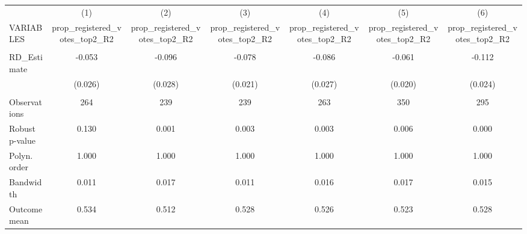 \documentclass[]{article}
\begin{document}
\begin{tabular}{lcccccc} \hline
 & (1) & (2) & (3) & (4) & (5) & (6) \\
VARIABLES & prop\_registered\_votes\_top2\_R2 & prop\_registered\_votes\_top2\_R2 & prop\_registered\_votes\_top2\_R2 & prop\_registered\_votes\_top2\_R2 & prop\_registered\_votes\_top2\_R2 & prop\_registered\_votes\_top2\_R2 \\ \hline
 &  &  &  &  &  &  \\
RD\_Estimate & -0.053 & -0.096 & -0.078 & -0.086 & -0.061 & -0.112 \\
 & (0.026) & (0.028) & (0.021) & (0.027) & (0.020) & (0.024) \\
 &  &  &  &  &  &  \\
Observations & 264 & 239 & 239 & 263 & 350 & 295 \\
Robust p-value & 0.130 & 0.001 & 0.003 & 0.003 & 0.006 & 0.000 \\
Polyn. order & 1.000 & 1.000 & 1.000 & 1.000 & 1.000 & 1.000 \\
Bandwidth & 0.011 & 0.017 & 0.011 & 0.016 & 0.017 & 0.015 \\
 Outcome mean & 0.534 & 0.512 & 0.528 & 0.526 & 0.523 & 0.528 \\ \hline
\end{tabular}
\end{document}
